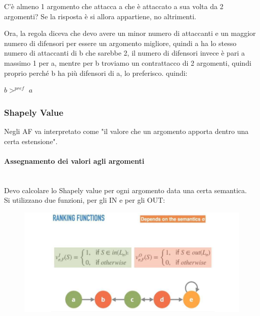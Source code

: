 \vspace{0.3cm}

\noindent C'è almeno 1 argomento che attacca a che è attaccato a sua volta
da 2 argomenti? Se la risposta è si allora appartiene, no altrimenti.

\vspace{0.3cm}

\noindent Ora, la regola diceva che devo avere un minor numero di attaccanti
e un maggior numero di difensori per essere un argomento migliore, quindi a
ha lo stesso numero di attaccanti di b che sarebbe 2, il numero di difensori
invece è pari a massimo 1 per a, mentre per b troviamo un contrattacco di 2
argomenti, quindi proprio perché b ha più difensori di a, lo preferisco.
quindi:
\begin{center}
    $b >^{pref}$ $a$
\end{center}
\subsubsection{Shapely Value}
Negli AF va interpretato come "il valore che un argomento apporta dentro una
certa estensione".
\paragraph{Assegnamento dei valori agli argomenti} \ \\
Devo calcolare lo Shapely value per ogni argomento data una certa semantica.
\\
Si utilizzano due funzioni, per gli IN e per gli OUT:
\begin{figure}[htp]
    \centering
    \includegraphics[width=13cm, keepaspectratio]{img/Cap8/ordinamento-quantitativo.png}
\end{figure}

